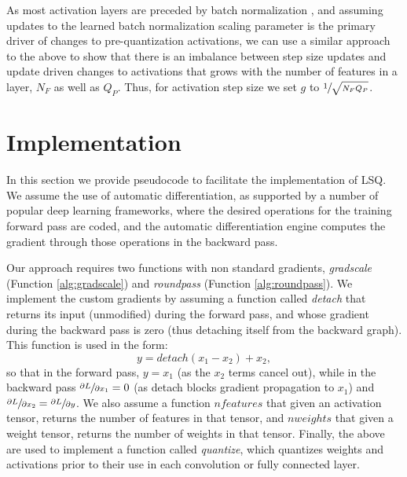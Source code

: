 \documentclass{article}
\begin{document}
As most activation layers are preceded by batch normalization \citep{ioffe2015batch}, and assuming updates to the learned batch normalization scaling parameter is the primary driver of changes to pre-quantization activations, we can use a similar approach to the above to show that there is an imbalance between step size updates and update driven changes to activations that grows with the number of features in a layer, $N_F$ as well as $Q_P$.  Thus, for activation step size we set $g$ to $\sfrac{1}{\sqrt{N_FQ_P}}$.



\section{Implementation}

\newcommand{\algrule}[1][.2pt]{\par\vskip0.2\baselineskip\hrule height #1\par\vskip.2\baselineskip}%

In this section we provide pseudocode to facilitate the implementation of LSQ.
%
We assume the use of automatic differentiation, as supported by a number of popular deep learning frameworks, where the desired operations for the training forward pass are coded, and the automatic differentiation engine computes the gradient through those operations in the backward pass.

Our approach requires two functions with non standard gradients, \textit{gradscale} (Function \ref{alg:gradscale}) and \textit{roundpass} (Function \ref{alg:roundpass}).
%
We implement the custom gradients by assuming a function called \textit{detach} that returns its input (unmodified) during the forward pass, and whose gradient during the backward pass is zero (thus detaching itself from the backward graph).
This function is used in the form:
\begin{equation}
y = detach(x_1 - x_2) + x_2,
\end{equation}
so that in the forward pass, $y=x_1$ (as the $x_2$ terms cancel out), while in the backward pass $\sfrac{\partial L}{\partial x_1} = 0$ (as detach blocks gradient propagation to $x_1$) and $\sfrac{\partial L}{\partial x_2} = \sfrac{\partial L}{\partial y}$.
%
We also assume a function $nfeatures$ that given an activation tensor, returns the number of features in that tensor, and $nweights$ that given a weight tensor, returns the number of weights in that tensor.
%
Finally, the above are used to implement a function called \textit{quantize}, which quantizes weights and activations prior to their use in each convolution or fully connected layer.
\end{document}
